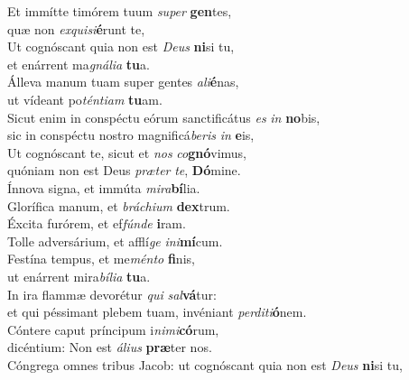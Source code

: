 \evenverse Et immítte timórem tuum \textit{su}\textit{per} \textbf{gen}tes,~\*\\
\evenverse quæ non \textit{ex}\textit{qui}\textit{si}\textbf{é}runt te,\\
\oddverse Ut cognóscant quia non est \textit{De}\textit{us} \textbf{ni}si tu,~\*\\
\oddverse et enárrent ma\textit{gná}\textit{li}\textit{a} \textbf{tu}a.\\
\evenverse Álleva manum tuam super gentes \textit{a}\textit{li}\textbf{é}nas,~\*\\
\evenverse ut vídeant po\textit{tén}\textit{ti}\textit{am} \textbf{tu}am.\\
\oddverse Sicut enim in conspéctu eórum sanctificátus \textit{es} \textit{in} \textbf{no}bis,~\*\\
\oddverse sic in conspéctu nostro magnificá\textit{be}\textit{ris} \textit{in} \textbf{e}is,\\
\evenverse Ut cognóscant te, sicut et \textit{nos} \textit{co}\textbf{gnó}vimus,~\*\\
\evenverse quóniam non est Deus \textit{præ}\textit{ter} \textit{te}, \textbf{Dó}mine.\\
\oddverse Ínnova signa, et immúta \textit{mi}\textit{ra}\textbf{bí}lia.~\*\\
\oddverse Glorífica manum, et \textit{brá}\textit{chi}\textit{um} \textbf{dex}trum.\\
\evenverse Éxcita furórem, et ef\textit{fún}\textit{de} \textbf{i}ram.~\*\\
\evenverse Tolle adversárium, et afflí\textit{ge} \textit{i}\textit{ni}\textbf{mí}cum.\\
\oddverse Festína tempus, et me\textit{mén}\textit{to} \textbf{fi}nis,~\*\\
\oddverse ut enárrent mira\textit{bí}\textit{li}\textit{a} \textbf{tu}a.\\
\evenverse In ira flammæ devorétur \textit{qui} \textit{sal}\textbf{vá}tur:~\*\\
\evenverse et qui péssimant plebem tuam, invéniant \textit{per}\textit{di}\textit{ti}\textbf{ó}nem.\\
\oddverse Cóntere caput príncipum i\textit{ni}\textit{mi}\textbf{có}rum,~\*\\
\oddverse dicéntium: Non est \textit{á}\textit{li}\textit{us} \textbf{præ}ter nos.\\
\evenverse Cóngrega omnes tribus Jacob: ut cognóscant quia non est \textit{De}\textit{us} \textbf{ni}si tu,~\*\\
